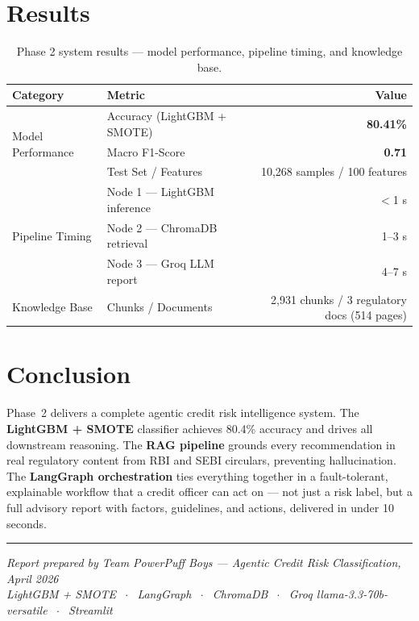 \documentclass[11pt,a4paper]{article}
\begin{document}
\section{Results}

\begin{table}[h!]
    \centering
    \small
    \renewcommand{\arraystretch}{1.4}
    \begin{tabularx}{\textwidth}{@{} l X r @{}}
        \toprule
        \textbf{Category} & \textbf{Metric} & \textbf{Value} \\
        \midrule
        \multirow{3}{*}{Model Performance}
            & Accuracy (LightGBM + SMOTE)  & \textbf{80.41\%} \\
            & Macro F1-Score               & \textbf{0.71} \\
            & Test Set / Features          & 10,268 samples / 100 features \\
        \midrule
        \multirow{3}{*}{Pipeline Timing}
            & Node 1 --- LightGBM inference   & $<$1 s \\
            & Node 2 --- ChromaDB retrieval    & 1--3 s \\
            & Node 3 --- Groq LLM report       & 4--7 s \\
        \midrule
        Knowledge Base
            & Chunks / Documents           & 2,931 chunks / 3 regulatory docs (514 pages) \\
        \bottomrule
    \end{tabularx}
    \caption{Phase 2 system results --- model performance, pipeline timing, and knowledge base.}
    \label{tab:results}
\end{table}

\section{Conclusion}

Phase~2 delivers a complete agentic credit risk intelligence system. The \textbf{LightGBM + SMOTE} classifier achieves 80.4\% accuracy and drives all downstream reasoning. The \textbf{RAG pipeline} grounds every recommendation in real regulatory content from RBI and SEBI circulars, preventing hallucination. The \textbf{LangGraph orchestration} ties everything together in a fault-tolerant, explainable workflow that a credit officer can act on --- not just a risk label, but a full advisory report with factors, guidelines, and actions, delivered in under 10 seconds.

\vspace{2.5em}
\noindent\rule{\textwidth}{0.4pt}
\begin{center}
\small\textit{Report prepared by Team PowerPuff Boys --- Agentic Credit Risk Classification, April 2026}\\[2pt]
\small\textit{LightGBM + SMOTE $\;\cdot\;$ LangGraph $\;\cdot\;$ ChromaDB $\;\cdot\;$ Groq llama-3.3-70b-versatile $\;\cdot\;$ Streamlit}
\end{center}

\end{document}
